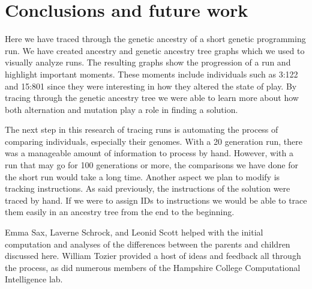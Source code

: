 \section{Conclusions and future work}
\label{sec:conclusions}

Here we have traced through the genetic ancestry of a short genetic programming run. We have created
ancestry and genetic ancestry tree graphs which we used to visually analyze runs. The resulting graphs
show the progression of a run and highlight important moments. These moments include individuals such as 3:122 and 15:801 since they were interesting in how they altered the state of play. By tracing through the genetic ancestry tree we were able to learn more about how both alternation and mutation play a role in finding a solution.

The next step in this research of tracing runs is automating the process of comparing individuals, especially their genomes. With a 20 generation run, there was a manageable amount of information to process by hand. However, with a run that may go for 100 generations or more, the comparisons we have done for the short run would take a long time. Another aspect we plan to modify is tracking instructions. As said previously, the instructions of the solution were traced by hand. If we were to assign IDs to instructions we would be able to trace them easily in an ancestry tree from the end to the beginning.

\begin{acknowledgement}
	Emma Sax, Laverne Schrock, and Leonid Scott helped 
	with the initial computation and analyses of the differences between the 
	parents and children discussed here. William Tozier provided a host of 
	ideas and feedback all through the process, as did numerous members
	of the Hampshire College Computational Intelligence lab.
\end{acknowledgement}



